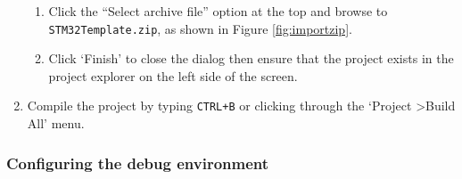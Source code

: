\documentclass{UoNMCHA}
\numberwithin{equation}{section}
\begin{document}
\begin{enumerate}
\begin{enumerate}
        \item Click the ``Select archive file'' option at the top and browse to \texttt{STM32Template.zip}, as shown in Figure \ref{fig:importzip}.
    
        \item Click `Finish' to close the dialog then ensure that the project exists in the project explorer on the left side of the screen.
    \end{enumerate}
    
    \item Compile the project by typing \texttt{CTRL+B} or clicking through the `Project \textgreater Build All' menu.
\end{enumerate}

\pagebreak

\subsubsection{Configuring the debug environment}
\end{document}
